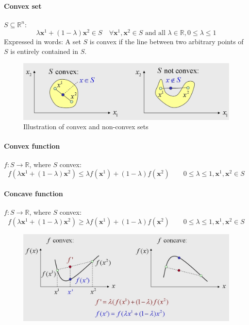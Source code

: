 \documentclass[11pt]{article}
\begin{document}
\paragraph{Convex set} $S\subseteq\mathbb{R}^n$:
\begin{equation*}
	\lambda\textbf{x}^1 + (1-\lambda)\textbf{x}^2 \in S \quad\forall\textbf{x}^1,\textbf{x}^2\in S\text{ and all }\lambda\in\mathbb{R}, 0\leq\lambda\leq 1
\end{equation*}
\noindent
Expressed in words: A set $S$ is convex if the line between two arbitrary points of $S$ is entirely contained in $S$.
\begin{figure}[H]
	\centering
	\includegraphics[width=0.8\linewidth, keepaspectratio]{convex_set}
	\caption{Illustration of convex and non-convex sets}
	\label{fig:convexset}
\end{figure}

\paragraph{Convex function} $f:S\rightarrow\mathbb{R}$, where $S$ convex:
\begin{equation*}
	f(\lambda\textbf{x}^1 + (1-\lambda)\textbf{x}^2) \leq \lambda f(\textbf{x}^1) + (1-\lambda)f(\textbf{x}^2)\qquad 0\leq\lambda\leq 1, \textbf{x}^1,\textbf{x}^2 \in S
\end{equation*}

\paragraph{Concave function} $f:S\rightarrow\mathbb{R}$, where $S$ convex:
\begin{equation*}
f(\lambda\textbf{x}^1 + (1-\lambda)\textbf{x}^2) \geq \lambda f(\textbf{x}^1) + (1-\lambda)f(\textbf{x}^2)\qquad 0\leq\lambda\leq 1, \textbf{x}^1,\textbf{x}^2 \in S
\end{equation*}

\begin{figure}[H]
	\centering
	\includegraphics[width=0.7\linewidth, keepaspectratio]{convex_function}
	\label{fig:convexfunction}
\end{figure}
\end{document}
